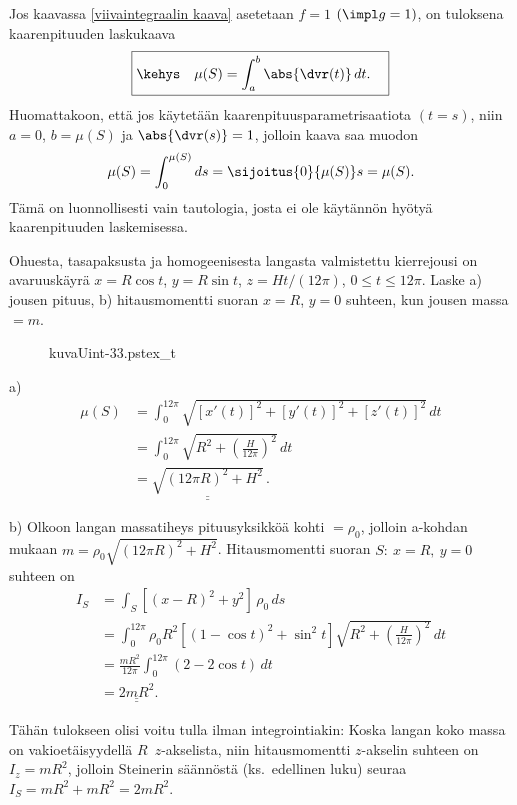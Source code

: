 Jos kaavassa \eqref{viivaintegraalin kaava} asetetaan $f=1$ $(\impl g=1)$, on tuloksena
kaarenpituuden laskukaava
\[
\boxed{\kehys\quad \mu(S)=\int_a^b \abs{\dvr(t)}\,dt. \quad}
\]
Huomattakoon, että jos käytetään kaarenpituusparametrisaatiota $(t=s)$, niin $a=0$, $b=\mu(S)$
ja $\abs{\dvr(s)}=1$, jolloin kaava saa muodon
\[
\mu(S)=\int_0^{\mu(S)}ds=\sijoitus{0}{\mu(S)} s=\mu(S).
\]
Tämä on luonnollisesti vain tautologia, josta ei ole käytännön hyötyä kaarenpituuden
laskemisessa.
\begin{multicols}{2}
\begin{Exa}
Ohuesta, tasapaksusta ja homogeenisesta langasta valmistettu kierrejousi on avaruuskäyrä 
$x=R\cos t$, $y=R\sin t$, $z=Ht/(12\pi)$,  $0 \le t \le 12\pi$. Laske a) jousen pituus, 
b) hitausmomentti suoran $x=R$, $y=0$ suhteen, kun jousen massa $=m$.
\begin{figure}[H]
\begin{center}
{kuvaUint-33.pstex_t}
\end{center}
\end{figure}
\end{Exa}
\end{multicols}
\ratk a)
\begin{align*}
\mu(S) &= \int_0^{12\pi} \sqrt{[x'(t)]^2+[y'(t)]^2+[z'(t)]^2}\,dt \\
       &= \int_0^{12\pi} \sqrt{R^2+\left(\frac{H}{12\pi}\right)^2}\,dt \\[2mm]
       &= \underline{\underline{\sqrt{(12\pi R)^2+H^2}}}\,.
\end{align*}

b) Olkoon langan massatiheys pituusyksikköä kohti $=\rho_0$, jolloin a-kohdan mukaan 
$m = \rho_0\sqrt{(12\pi R)^2+H^2}$. Hitausmomentti suoran $S:\ x=R,\ y=0$ suhteen on
\begin{align*}
I_S &= \int_S \left[(x-R)^2+y^2\right]\,\rho_0\,ds \\
    &= \int_0^{12\pi} \rho_0 R^2 \left[(1-\cos t)^2 + \sin^2 t\right]
                       \sqrt{R^2+\left(\frac{H}{12\pi}\right)^2}\,dt \\
    &= \frac{mR^2}{12\pi}\int_0^{12\pi}(2-2\cos t)\,dt \\[2mm]
    &= \underline{\underline{2mR^2}}.
\end{align*}

Tähän tulokseen olisi voitu tulla ilman integrointiakin: Koska langan koko massa on
vakioetäisyydellä $R\,$ $z$-akselista, niin hitausmomentti $z$-akselin suhteen on
$I_z=mR^2$, jolloin Steinerin säännöstä (ks.\ edellinen luku) seuraa $I_S=mR^2+mR^2=2mR^2$.
\loppu 

